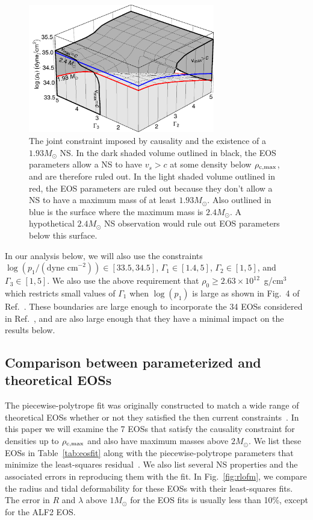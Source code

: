 \documentclass[twocolumn,prd,amssymb,aps,nofootinbib,showpacs,epsf]{revtex4}
\begin{document}
\begin{figure}[!htb]
\begin{center}
\includegraphics[width=3.2in]{mvs3d.png}
\caption{The joint constraint imposed by causality and the existence of a $1.93M_\odot$ NS. In the dark shaded volume outlined in black, the EOS parameters allow a NS to have $v_s>c$ at some density below $\rho_{\rm c, max}$, and are therefore ruled out. In the light shaded volume outlined in red, the EOS parameters are ruled out because they don't allow a NS to have a maximum mass of at least $1.93M_\odot$. Also outlined in blue is the surface where the maximum mass is $2.4M_\odot$. A hypothetical $2.4M_\odot$ NS observation would rule out EOS parameters below this surface.}
\label{fig:mvs3d}
\end{center}
\end{figure}

In our analysis below, we will also use the constraints $\log(p_1/(\text{dyne cm}^{-2})) \in [33.5, 34.5]$, $\Gamma_1 \in [1.4, 5]$, $\Gamma_2 \in [1, 5]$, and $\Gamma_3 \in [1, 5]$. We also use the above requirement that $\rho_0 \ge 2.63\times 10^{12}$~g/cm$^3$ which restricts small values of $\Gamma_1$ when $\log(p_1)$ is large as shown in Fig.~4 of Ref.~\cite{ReadLackey2009}. These boundaries are large enough to incorporate the 34 EOSs considered in Ref.~\cite{ReadLackey2009}, and are also large enough that they have a minimal impact on the results below.


\subsection{Comparison between parameterized and theoretical EOSs}

The piecewise-polytrope fit was originally constructed to match a wide range of theoretical EOSs whether or not they satisfied the then current constraints~\cite{ReadLackey2009}. In this paper we will examine the 7 EOSs that satisfy the causality constraint for densities up to $\rho_{\rm c, max}$ and also have maximum masses above $2M_\odot$. We list these EOSs in Table~\ref{tab:eosfit} along with the piecewise-polytrope parameters that minimize the least-squares residual~\cite{ReadLackey2009}. We also list several NS properties and the associated errors in reproducing them with the fit. In Fig.~\ref{fig:rlofm}, we compare the radius and tidal deformability for these EOSs with their least-squares fits.  The error in $R$ and $\lambda$ above $1M_\odot$ for the EOS fits is usually less than 10\%, except for the ALF2 EOS.
\end{document}
